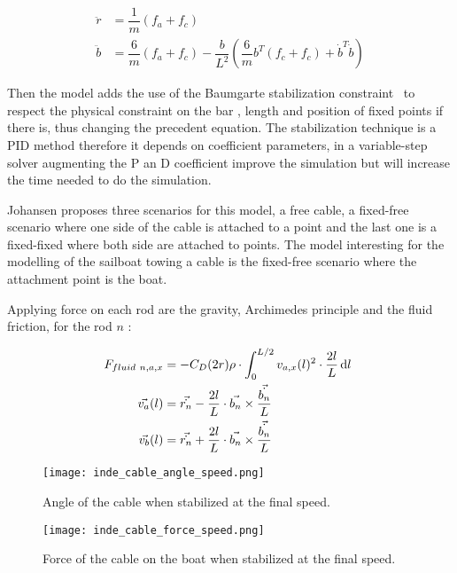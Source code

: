 \begin{align}
\ddot{r} &= \dfrac{1}{m}  (f_a+f_c) \\
\ddot{b} &=  \dfrac{6}{m}(f_a+f_c) - \dfrac{b}{L^{2}}  (\dfrac{6}{m}b^{T}(f_c+f_c)+\dot{b}^{T}\dot{b}) 
\end{align}



Then the model adds the use of the Baumgarte stabilization constraint~\cite{baumgarte1972stabilization} to respect the physical constraint on the bar , length and position of fixed points if there is, thus changing the precedent equation. 
The stabilization technique is a PID method therefore it depends on coefficient parameters, in a variable-step solver augmenting the P an D coefficient improve the simulation but will increase the time needed to do the simulation.

Johansen proposes three scenarios for this model, a free cable, a fixed-free scenario where one side of the cable is attached to a point and the last one is a fixed-fixed where both side are attached to points.
The model interesting for the modelling of the sailboat towing a cable is the fixed-free scenario where the attachment point is the boat.

Applying force on each rod are the gravity, Archimedes principle and the fluid friction, for the rod $n$ :

{
\begin{align}
\centering
F_{fluid~n,a,x} &= -C_D (2 r ) \rho \cdot \displaystyle \int_{0}^{L/2} v_{a,x}(l)^2 \cdot \frac{2l}{L} \, \mathrm{d}l\ \nonumber \\
\vec{v_{a}}(l) &= \vec{\dot{r_n}} - \frac{2 l}{L} \cdot \vec{b_n} \times \frac{\vec{\dot{b_n}}}{L} \nonumber \\
\vec{v_{b}}(l) &= \vec{\dot{r_n}} + \frac{2 l}{L} \cdot \vec{b_n} \times \frac{\vec{\dot{b_n}}}{L}
\end{align}
}



\begin{figure}[H]
\centering
    \begin{minipage}[b]{0.4\textwidth}
    \centering
    \texttt{[image: inde\_cable\_angle\_speed.png]}
    \caption{Angle of the cable when stabilized at the final speed.}
    \label{fig:angleIndSpeed}
    \end{minipage}
    \hfill
    \begin{minipage}[b]{0.45\textwidth}
    \centering
    \texttt{[image: inde\_cable\_force\_speed.png]}
    \caption{Force of the cable on the boat when stabilized at the final speed.}
    \label{fig:forceIndSpeed}
    \end{minipage}
\end{figure}


